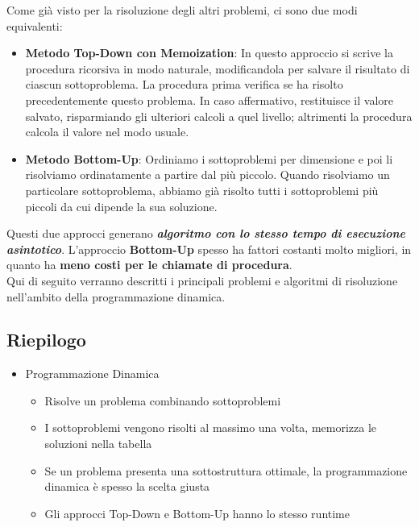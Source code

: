 Come già visto per la risoluzione degli altri problemi, ci sono due 
modi equivalenti:
\begin{itemize}
  \item \textbf{Metodo Top-Down con Memoization}: In questo
        approccio si scrive la procedura ricorsiva in modo naturale,
        modificandola per salvare il risultato di ciascun sottoproblema. La
        procedura prima verifica se ha risolto precedentemente questo problema.
        In caso affermativo, restituisce il valore salvato, risparmiando gli
        ulteriori calcoli a quel livello; altrimenti la procedura calcola il
        valore nel modo usuale.
  \item \textbf{Metodo Bottom-Up}: Ordiniamo i
        sottoproblemi per dimensione e poi li risolviamo ordinatamente a partire
        dal più piccolo. Quando risolviamo un particolare sottoproblema, abbiamo
        già risolto tutti i sottoproblemi più piccoli da cui dipende la sua
        soluzione.
\end{itemize}

Questi due approcci generano \textbf{\emph{algoritmo con lo stesso tempo
    di esecuzione asintotico}}. L'approccio \textbf{Bottom-Up} spesso ha
fattori costanti molto migliori, in quanto ha \textbf{meno costi per le
  chiamate di procedura}.\\
Qui di seguito verranno descritti i principali
problemi e algoritmi di risoluzione nell'ambito della programmazione
dinamica.\\

\subsection{Riepilogo}

\begin{itemize}
  \item
        Programmazione Dinamica

        \begin{itemize}
          \item
                Risolve un problema combinando sottoproblemi
          \item
                I sottoproblemi vengono risolti al massimo una volta, memorizza le
                soluzioni nella tabella
          \item
                Se un problema presenta una sottostruttura ottimale, la
                programmazione dinamica è spesso la scelta giusta
          \item
                Gli approcci Top-Down e Bottom-Up hanno lo stesso runtime
        \end{itemize}
\end{itemize}